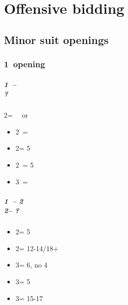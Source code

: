 \documentclass[12pt, a4paper]{report}
\begin{document}
\part*{\colorbox{RoyalPurple!30}{Offensive bidding}}
 {

    \chapter*{\colorbox{Plum!30}{Minor suit openings}}
     {

    }

    \section*{\colorbox{blue!30}{1\clubs\ opening}}
     {

        \subsubsection*{1\clubs\ -- \alrts{2\clubs} \\ ?}
        2\clubs = \gf\ \nat\ or \bal
        \begin{itemize}
            \item 2\diams\ = \bal
            \item 2\major = 5\major
            \item 2\nt\ = 5\diams
            \item 3\clubs\ = \clubs
        \end{itemize}

        \subsubsection*{1\clubs\ -- 2\clubs \\
                    2\diams -- ?}
        \begin{itemize}
            \item 2\major = 5\major
            \item 2\nt = 12-14/18+ \bal
            \item 3\clubs = 6\clubs, no 4\major
            \item 3\diams = 5\diams
            \item 3\nt = 15-17 \bal
        \end{itemize}
    }

}
\end{document}
